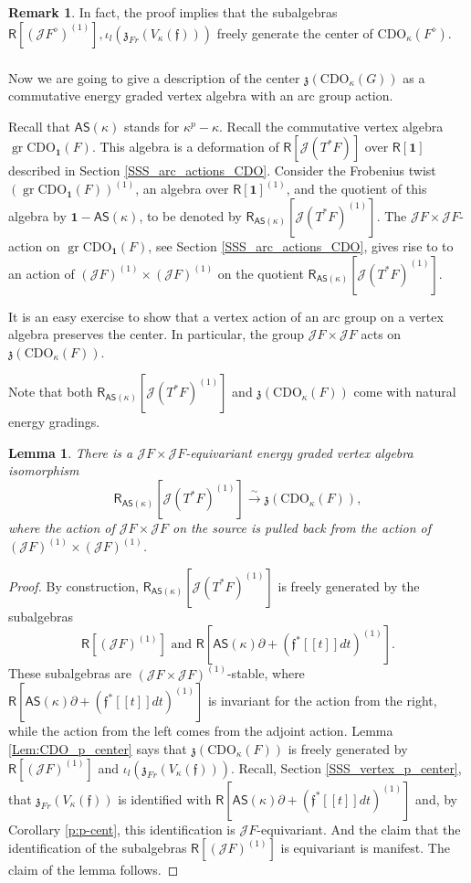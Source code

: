 \documentclass{amsart}
\newtheorem{Lem}[Thm]{Lemma}
\theoremstyle{definition}
\newtheorem{Rem}[Thm]{Remark}
\newcommand{\sss}{\subsubsection{}}
\newcommand{\Ring}{\mathsf{R}}
\newcommand{\gr}{\operatorname{gr}}
\newcommand{\Jet}{\mathscr{J}}
\newcommand{\ff}{\mathfrak{f}}
\newcommand{\AS}{\mathsf{AS}}
\newcommand{\CDO}{\mathrm{CDO}}
\newcommand{\bone}{\mathbf{1}}
\numberwithin{equation}{section}
\begin{document}
\begin{Rem}\label{Rem:center_CDO_localization}
In fact, the proof implies that the subalgebras $\Ring[(\Jet F^\diamond)^{(1)}],\iota_l(\mathfrak{z}_{Fr}(V_\kappa(\ff)))$
freely generate the center of $\CDO_\kappa(F^\diamond)$. 
\end{Rem}

\sss Now we are going to give a description of the center  $\mathfrak{z}(\CDO_\kappa(G))$ as a commutative energy graded vertex algebra with an arc group action. 

Recall that $\AS(\kappa)$ stands for $\kappa^p-\kappa$. Recall the commutative vertex algebra $\gr \CDO_{\bone}(F)$. This algebra is a deformation 
of $\Ring[\Jet (T^*F)]$ over $\Ring[\mathbf{1}]$ described in Section \ref{SSS_arc_actions_CDO}. Consider the Frobenius twist $(\gr \CDO_{\bone}(F))^{(1)}$, an algebra over $\Ring[\mathbf{1}]^{(1)}$, and the quotient of this algebra by $\mathbf{1}-\AS(\kappa)$, to be denoted by $\Ring_{\AS(\kappa)}[\Jet(T^*F)^{(1)}]$.
The $\Jet F\times \Jet F$-action on $\gr \CDO_{\bone}(F)$,
see Section \ref{SSS_arc_actions_CDO}, gives rise to to an action of $(\Jet F)^{(1)}\times (\Jet F)^{(1)}$ on the quotient
$\Ring_{\AS(\kappa)}[\Jet(T^*F)^{(1)}]$. 


It is an easy exercise to show that a vertex action of an arc group on a vertex algebra preserves the center. In particular, the group $\Jet F\times \Jet F$ acts on $\mathfrak{z}(\CDO_\kappa(F))$. 

Note that both $\Ring_{\AS(\kappa)}[\Jet(T^*F)^{(1)}]$ and $\mathfrak{z}(\CDO_\kappa(F))$ come with natural energy gradings. 

\begin{Lem}\label{Lem:CDO_center_description}
There is a $\Jet F\times \Jet F$-equivariant energy graded vertex algebra isomorphism
$$\Ring_{\AS(\kappa)}[\Jet(T^*F)^{(1)}]\xrightarrow{\sim} \mathfrak{z}(\CDO_\kappa(F)),$$
where the action of $\Jet F\times \Jet F$ on the source is pulled back from the action of $(\Jet F)^{(1)}\times (\Jet F)^{(1)}$.
\end{Lem}
\begin{proof}
By construction, $\Ring_{\AS(\kappa)}[\Jet(T^*F)^{(1)}]$ is freely generated by the subalgebras $$\Ring[(\Jet F)^{(1)}] \text{ and }
\Ring\left[\AS(\kappa)\partial+ (\ff^*[[t]]dt)^{(1)}\right].$$ These subalgebras are $(\Jet F\times \Jet F)^{(1)}$-stable, where $\Ring\left[\AS(\kappa)\partial+ (\ff^*[[t]]dt)^{(1)}\right]$ is invariant for the action from the right, while the action from the left comes from the adjoint action. Lemma \ref{Lem:CDO_p_center} says that $\mathfrak{z}(\CDO_\kappa(F))$ is freely generated by $\Ring[(\Jet F)^{(1)}]$ and $\iota_l(\mathfrak{z}_{Fr}(V_\kappa(\ff)))$. Recall, 
Section \ref{SSS_vertex_p_center}, that 
$\mathfrak{z}_{Fr}(V_\kappa(\ff))$ is identified with 
$\Ring\left[\AS(\kappa)\partial+ (\ff^*[[t]]dt)^{(1)}\right]$ and, by Corollary \ref{p:p-cent}, this identification is $\Jet F$-equivariant. And the claim that the identification of the subalgebras $\Ring[(\Jet F)^{(1)}]$ is equivariant is manifest. The claim of the lemma follows.
\end{proof}
\end{document}
